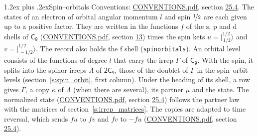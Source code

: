 \documentclass[10pt,a4paper]{article}
\makeatletter
\renewcommand\section{\@startsection{section}{1}{\z@}{-3ex plus -1ex minus -.2ex}%
  {1.2ex plus .2ex}{\normalfont\large\sffamily\bfseries\color{parttitle}}}
\numberwithin{equation}{section}
\newcommand{\grp}[1]{\mathsf{#1}}
\newcommand{\orbital}[1]{\mathrm{#1}}
\newcommand{\mult}{\kappa}
\newcommand{\intx}{\mu}
\newcommand{\jm}[2]{\bigl\lvert{}^{#1}_{\,#2}\bigr\rangle}
\makeatother
\begin{document}
\section{Spin--orbitals}\label{s:spin_orbitals}
Conventions: \href{../../CONVENTIONS.pdf}{CONVENTIONS.pdf}, section \href{../../CONVENTIONS.pdf\#conv.25.4}{25.4}.
\leavevmode\label{n:index.orbital.l}The states of an electron of orbital angular momentum $l$ and spin $\nicefrac{1}{2}$ are each given up to a positive factor. \label{n:local.spinor.uv}\label{n:local.function.f}They are written in the functions $f$ of the $\orbital{s}$, $\orbital{p}$ and $\orbital{d}$ shells of \href{../../../rotation/data/pdf/C9.pdf}{$\grp{C_{9}}$} (\href{../../CONVENTIONS.pdf}{CONVENTIONS.pdf}, section \href{../../../rotation/CONVENTIONS.pdf\#conv.13}{13}) times the spin kets $u = \jm{1/2}{1/2}$ and $v = \jm{1/2}{-1/2}$. The record also holds the $\orbital{f}$ shell (\texttt{spinorbitals}). An orbital level consists of the functions of degree $l$ that carry the irrep $\Gamma$ of \href{../../../rotation/data/pdf/C9.pdf}{$\grp{C_{9}}$}. With the spin, it splits into the spinor irreps $\Lambda$ of $\grp{2C_{9}}$, those of the doublet of $\Gamma$ in the spin--orbit levels (section~\ref{s:spin_orbit}, first column). \label{n:head.state}Under the heading of its shell, a row gives $\Gamma$, a copy $\mult$ of $\Lambda$ (when there are several), its partner $\intx$ and the state. The normalized state (\href{../../CONVENTIONS.pdf}{CONVENTIONS.pdf}, section \href{../../CONVENTIONS.pdf\#conv.25.4}{25.4}) follows the partner law with the matrices of section~\ref{s:irrep_matrices}. The copies are adapted to time reversal, which sends $f u$ to $f v$ and $f v$ to $-f u$ (\href{../../CONVENTIONS.pdf}{CONVENTIONS.pdf}, section \href{../../CONVENTIONS.pdf\#conv.25.4}{25.4}).
\end{document}
